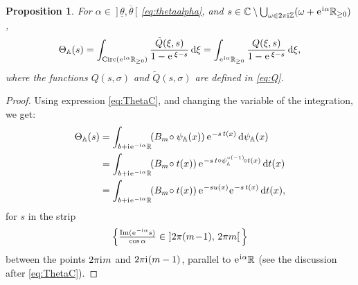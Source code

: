 \documentclass[a4paper,11pt]{amsart}
\numberwithin{equation}{section}
\newcommand{\C}{{\mathbb C}}
\newcommand{\Z}{{\mathbb Z}}
\newcommand{\R}{{\mathbb R}}
\newcommand{\sminus}{\setminus} %
\newcommand{\im}{\operatorname{Im}}
\renewcommand{\i}{\mathrm{i}\mkern.25\thinmuskip}
\renewcommand{\d}{\ensuremath{\operatorname{d}\!}}
\newcommand{\e}{\ensuremath{\mkern.25\thinmuskip\mathrm{e}\mkern.4\thinmuskip}}
\newcommand{\orbit}{\mathbb{A}}
\newcommand{\Circ}{\operatorname{Circ}}
\newtheorem{proposition}[theorem]{Proposition}
\theoremstyle{definition}
\begin{document}
\begin{proposition}\label{prop:druga}
 For $\alpha\in\ ]\,\underline{\theta},\overline{\theta}\,[$ \eqref{eq:thetaalpha},
and $s\in\C\sminus\bigcup_{\omega\in 2\pi\i \Z}(\omega+\e^{\i\alpha}\R_{\geq 0})$,
\begin{equation}\label{eq:ThetaQ}
	\Theta_\orbit(s)=\int_{\Circ(\e^{\i\alpha}\R_{\geq 0})} \frac{\tilde Q(\xi,s)}{1-\e^{\,\xi-s}}\d\xi
	=\int_{\e^{\i\alpha}\R_{\geq 0}} \frac{Q(\xi,s)}{1-\e^{\,\xi-s}}\d\xi,
\end{equation}	
where the functions $Q(s,\sigma)$ and $\tilde Q(s,\sigma)$ are defined in \eqref{eq:Q}.
\end{proposition}

\begin{proof}
Using expression \eqref{eq:ThetaC}, and changing the variable of the integration, we get:
\begin{equation}\label{eq:ThetaD}
\begin{aligned}
	\Theta_\orbit(s)&=\int_{b+\i \e^{-\i\alpha}\R}\!(B_m\!\circ\psi_\orbit(x))\,\e^{-s\,t(x)}\d\psi_\orbit(x)\\
	&=\int_{b+\i \e^{-\i\alpha}\R}\!(B_m\!\circ t(x))\,\e^{-s\,t\circ\psi_\orbit^{\circ(-1)}\!\circ t(x)}\d t(x)\\
	&=\int_{b+\i \e^{-\i\alpha}\R}\!(B_m\!\circ t(x))\,\e^{-su(x)}\e^{-s\,t(x)}\d t(x),
\end{aligned}
\end{equation}
for $s$ in the strip
\begin{equation}\label{eq:strip}
\Big\{\tfrac{\im(\e^{-\i \alpha}s)}{\cos\alpha}\in\ ]2\pi(m\!-\!1),\, 2\pi m[\,\Big\}\end{equation} 
between the points $2\pi\i m$ and $2\pi\i(m-1)$, parallel to $\e^{\i\alpha}\R$ (see the discussion after \eqref{eq:ThetaC}).


\end{proof}
\end{document}
